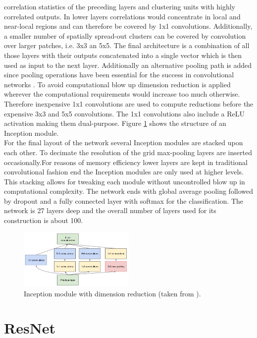 \documentclass[11pt]{report}
\begin{document}
correlation statistics of the preceding layers and clustering units with highly
correlated outputs. In lower layers correlations would concentrate in local and
near-local regions and can therefore be covered by 1x1 convolutions.
Additionally, a smaller number of spatially spread-out clusters can be covered
by convolution over larger patches, i.e. 3x3 an 5x5. The final architecture is a
combination of all those layers with their outputs concatenated into a single
vector which is then used as input to the next layer. Additionally an
alternative pooling path is added since pooling operations have been essential
for the success in convolutional networks \cite{szegedy2015going}. To avoid
computational blow up dimension reduction is applied wherever the computational
requirements would increase too much otherwise. Therefore inexpensive 1x1
convolutions are used to compute reductions before the expensive 3x3 and 5x5
convolutions. The 1x1 convolutions also include a ReLU activation making them
dual-purpose. Figure \ref{InceptionModule} shows the structure of an Inception
module. \\
For the final layout of the network several Inception modules are stacked
upon each other. To decimate the resolution of the grid max-pooling layers are
inserted occasionally.For reasons of memory efficiency lower layers are kept in
traditional convolutional fashion end the Inception modules are only used at
higher levels. This stacking allows for tweaking each module without
uncontrolled blow up in computational complexity. The network ends with global
average pooling followed by dropout and a fully connected layer with softmax for the
classification. The network is 27 layers deep and the overall number of layers
used for its construction is about 100.
\begin{figure}
  \centering
  \includegraphics[width=0.5\textwidth]{InceptionModule}
  \caption{Inception module with dimension reduction (taken from \cite{szegedy2015going}).}
  \label{InceptionModule}
\end{figure}

\section{ResNet}
\end{document}
